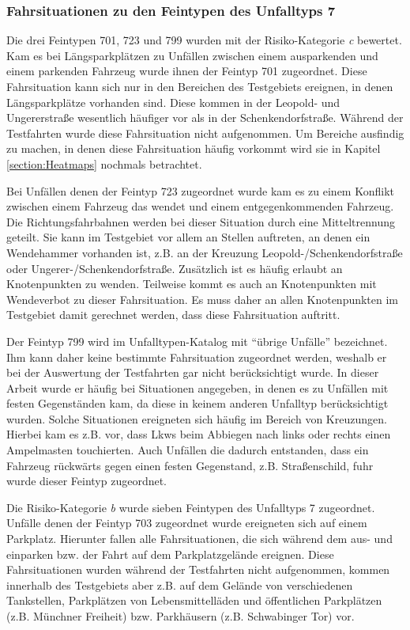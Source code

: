 \subsubsection{Fahrsituationen zu den Feintypen des Unfalltyps 7}
Die drei Feintypen 701, 723 und 799 wurden mit der Risiko-Kategorie \textit{c} bewertet. Kam es bei Längsparkplätzen zu Unfällen zwischen einem ausparkenden und einem parkenden Fahrzeug wurde ihnen der Feintyp 701 zugeordnet. Diese Fahrsituation kann sich nur in den Bereichen des Testgebiets ereignen, in denen Längsparkplätze vorhanden sind. Diese kommen in der Leopold- und Ungererstraße wesentlich häufiger vor als in der Schenkendorfstraße. Während der Testfahrten wurde diese Fahrsituation nicht aufgenommen. Um Bereiche ausfindig zu machen, in denen diese Fahrsituation häufig vorkommt wird sie in Kapitel \ref{section:Heatmaps} nochmals betrachtet.

Bei Unfällen denen der Feintyp 723 zugeordnet wurde kam es zu einem Konflikt zwischen einem Fahrzeug das wendet und einem entgegenkommenden Fahrzeug. Die Richtungsfahrbahnen werden bei dieser Situation durch eine Mitteltrennung geteilt. Sie kann im Testgebiet vor allem an Stellen auftreten, an denen ein Wendehammer vorhanden ist, z.B. an der Kreuzung Leopold-/Schenkendorfstraße oder Ungerer-/Schenkendorfstraße. Zusätzlich ist es häufig erlaubt an Knotenpunkten zu wenden. Teilweise kommt es auch an Knotenpunkten mit Wendeverbot zu dieser Fahrsituation. Es muss daher an allen Knotenpunkten im Testgebiet damit gerechnet werden, dass diese Fahrsituation auftritt.

Der Feintyp 799 wird im Unfalltypen-Katalog mit \enquote{übrige Unfälle} bezeichnet. Ihm kann daher keine bestimmte Fahrsituation zugeordnet werden, weshalb er bei der Auswertung der Testfahrten gar nicht berücksichtigt wurde. In dieser Arbeit wurde er häufig bei Situationen angegeben, in denen es zu Unfällen mit festen Gegenständen kam, da diese in keinem anderen Unfalltyp berücksichtigt wurden. Solche Situationen ereigneten sich häufig im Bereich von Kreuzungen. Hierbei kam es z.B. vor, dass Lkws beim Abbiegen nach links oder rechts einen Ampelmasten touchierten. Auch Unfällen die dadurch entstanden, dass ein Fahrzeug rückwärts gegen einen festen Gegenstand, z.B. Straßenschild, fuhr wurde dieser Feintyp zugeordnet.

Die Risiko-Kategorie \textit{b} wurde sieben Feintypen des Unfalltyps 7 zugeordnet. Unfälle denen der Feintyp 703 zugeordnet wurde ereigneten sich auf einem Parkplatz. Hierunter fallen alle Fahrsituationen, die sich während dem aus- und einparken bzw. der Fahrt auf dem Parkplatzgelände ereignen. Diese Fahrsituationen wurden während der Testfahrten nicht aufgenommen, kommen innerhalb des Testgebiets aber z.B. auf dem Gelände von verschiedenen Tankstellen, Parkplätzen von Lebensmittelläden und öffentlichen Parkplätzen (z.B. Münchner Freiheit) bzw. Parkhäusern (z.B. Schwabinger Tor) vor.

